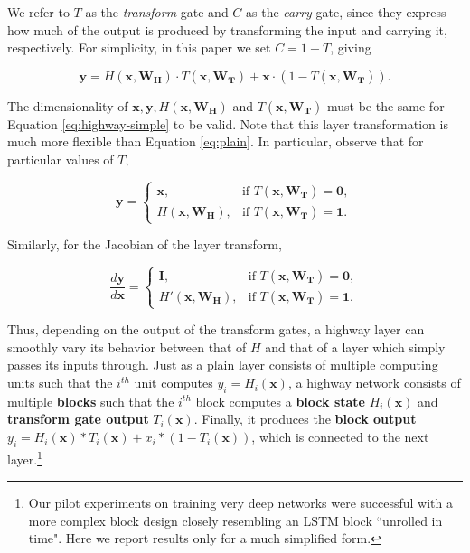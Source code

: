 \documentclass{article}
\renewcommand{\vec}[1]{\mathbf{#1}}
\begin{document}
We refer to $T$ as the \emph{transform} gate and $C$ as the \emph{carry} gate, since they express how much of the output is produced by transforming the input and carrying it, respectively. For simplicity, in this paper we set $C = 1 - T$, giving

\begin{equation}\label{eq:highway-simple}
\vec{y} = H(\vec{x}, \vec{W_H}) \cdotp T(\vec{x}, \vec{W_T}) + \vec{x} \cdot (1 - T(\vec{x}, \vec{W_T})).
\end{equation}

The dimensionality of $\vec{x}, \vec{y}, H(\vec{x}, \vec{W_H})$ and $T(\vec{x}, \vec{W_T})$ must be the same for Equation \ref{eq:highway-simple} to be valid.
Note that this layer transformation is much more flexible than Equation \ref{eq:plain}. 
In particular, observe that for particular values of $T$,

\begin{equation}\label{eq:highway-conditions}
\vec{y} = 
\begin{cases}
	\vec{x}, &\text{if } T(\vec{x}, \vec{W_T}) = \mathbf{0},\\
	H(\vec{x}, \vec{W_H}), &\text{if } T(\vec{x}, \vec{W_T}) = \mathbf{1}.
\end{cases}
\end{equation}

Similarly, for the Jacobian of the layer transform,

\begin{equation}
\frac{d\vec{y}}{d\vec{x}} = 
\begin{cases}
	\vec{I}, &\text{if } T(\vec{x}, \vec{W_T}) = \mathbf{0},\\
	H'(\vec{x}, \vec{W_H}), &\text{if } T(\vec{x}, \vec{W_T}) = \mathbf{1}.
\end{cases}
\end{equation}

Thus, depending on the output of the transform gates, a highway layer can smoothly vary its behavior between that of $H$ and that of a layer which simply passes its inputs through. Just as a plain layer consists of multiple computing units such that the $i^{th}$ unit computes $y_i = H_i(\vec{x})$, a highway network consists of multiple \textbf{blocks} such that the $i^{th}$ block computes a \textbf{block state} $H_i(\vec{x})$ and \textbf{transform gate output} $T_i(\vec{x})$. Finally, it produces the \textbf{block output} $y_i = H_i(\vec{x})*T_i(\vec{x}) + x_i*(1 - T_i(\vec{x}))$, which is connected to the next layer.\footnote{Our pilot experiments on training very deep networks were successful with a more complex block design closely resembling an LSTM block ``unrolled in time". Here we report results only for a much simplified form.}
\end{document}
